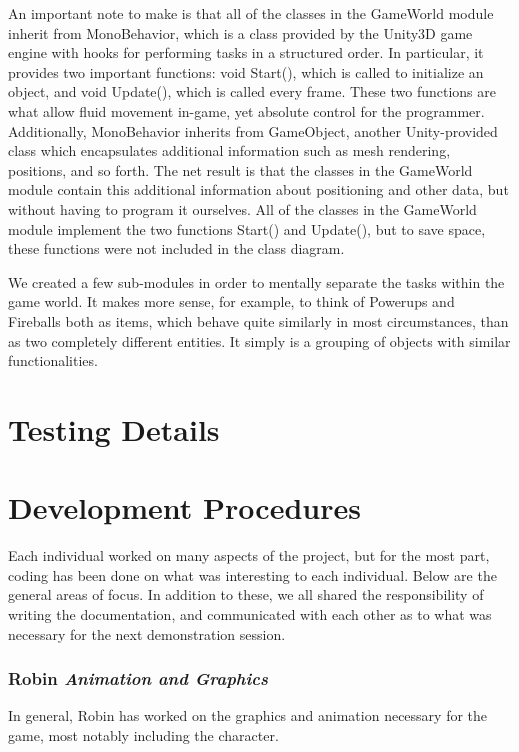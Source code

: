 \documentclass[10pt,letterpaper,oneside,english]{article}
\begin{document}
An important note to make is that all of the classes in the GameWorld module inherit from MonoBehavior, which is a class provided by the Unity3D game engine with hooks for performing tasks in a structured order. In particular, it provides two important functions: void Start(), which is called to initialize an object, and void Update(), which is called every frame. These two functions are what allow fluid movement in-game, yet absolute control for the programmer. Additionally, MonoBehavior inherits from GameObject, another Unity-provided class which encapsulates additional information such as mesh rendering, positions, and so forth. The net result is that the classes in the GameWorld module contain this additional information about positioning and other data, but without having to program it ourselves. All of the classes in the GameWorld module implement the two functions Start() and Update(), but to save space, these functions were not included in the class diagram.

We created a few sub-modules in order to mentally separate the tasks within the game world. It makes more sense, for example, to think of Powerups and Fireballs both as items, which behave quite similarly in most circumstances, than as two completely different entities. It simply is a grouping of objects with similar functionalities.

\section{Testing Details}

\section{Development Procedures}

Each individual worked on many aspects of the project, but for the most part, coding has been done on what was interesting to each individual. Below are the general areas of focus. In addition to these, we all shared the responsibility of writing the documentation, and communicated with each other as to what was necessary for the next demonstration session.

\subsubsection{Robin \textit{Animation and Graphics}}
In general, Robin has worked on the graphics and animation necessary for the game, most notably including the character.
\end{document}
